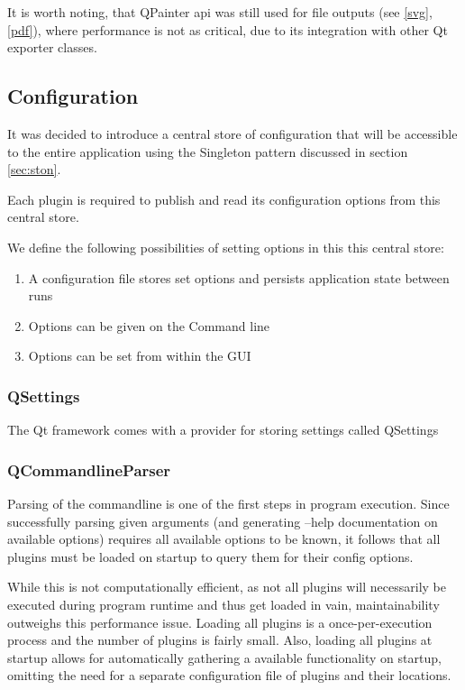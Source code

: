 It is worth noting, that QPainter \gls{api} was still used for file outputs (see \ref{svg}, \ref{pdf}), where performance is not as critical, due to its integration with other Qt exporter classes.

\subsection{Configuration}
It was decided to introduce a central store of configuration that will be accessible to the entire application using the Singleton pattern discussed in section \ref{sec:ston}.

Each plugin is required to publish and read its configuration options from this central store.

We define the following possibilities of setting options in this this central store:
\begin{enumerate}
	\item A configuration file stores set options and persists application state between runs
	\item Options can be given on the Command line
	\item Options can be set from within the GUI
\end{enumerate}

\subsubsection{QSettings}
The Qt framework comes with a provider for storing settings called QSettings 


\subsubsection{QCommandlineParser}
Parsing of the commandline is one of the first steps in program execution. Since successfully parsing given arguments (and generating --help documentation on available options) requires all available options to be known, it follows that all plugins must be loaded on startup to query them for their config options.

While this is not computationally efficient, as not all plugins will necessarily be executed during program runtime and thus get loaded in vain, maintainability outweighs this performance issue.
Loading all plugins is a once-per-execution process and the number of plugins is fairly small. Also, loading all plugins at startup allows for automatically gathering a available functionality on startup, omitting the need for a separate configuration file of plugins and their locations.

